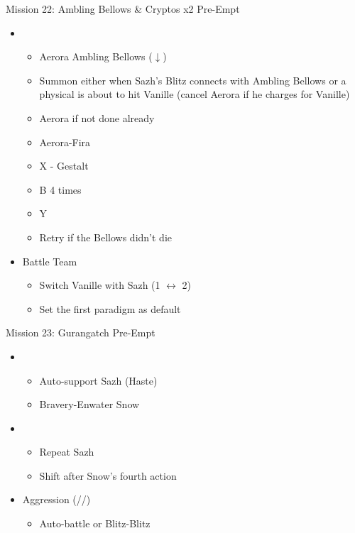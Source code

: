 \begin{multicols}{2}
\begin{battle}{Mission 22: Ambling Bellows \& Cryptos x2 Pre-Empt}
\begin{itemize}
    \item \sixth
    \begin{itemize}
        \item Aerora Ambling Bellows ($\downarrow$)
        \item Summon either when Sazh's Blitz connects with Ambling Bellows or a physical is about to hit Vanille (cancel Aerora if he charges for Vanille)
        \item Aerora if not done already
        \item Aerora-Fira
        \item X - Gestalt
        \item B 4 times
        \item Y
        \item Retry if the Bellows didn't die
    \end{itemize}
\end{itemize}
\end{battle}

\renewcommand{\sixth}{[6] Aggression (\com/\rav/\com)}

\begin{menu}
\begin{itemize}
    \paradigm
    \begin{itemize}
        \item Battle Team
        \begin{itemize}
            \item Switch Vanille with Sazh (1 $\leftrightarrow$ 2)
            \item Set the first paradigm as default
        \end{itemize}
    \end{itemize}
\end{itemize}
\end{menu}
\vfill
\begin{battle}{Mission 23: Gurangatch Pre-Empt}
\begin{itemize}
    \item \first
    \begin{itemize}
        \item Auto-support Sazh (Haste)
        \item Bravery-Enwater Snow
    \end{itemize}
    \item \fifth
    \begin{itemize}
        \item Repeat Sazh
        \item Shift after Snow's fourth action
    \end{itemize}
    \item \sixth
    \begin{itemize}
        \item Auto-battle or Blitz-Blitz
    \end{itemize}
\end{itemize}
\end{battle}


\end{multicols}
